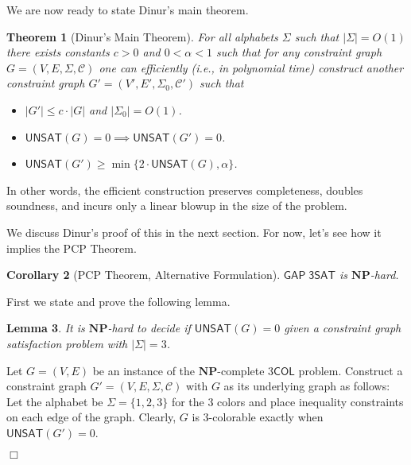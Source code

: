 \documentclass{article}
\newtheorem{theorem}{Theorem}
\newtheorem{example}[theorem]{Example}
\newtheorem{lemma}[theorem]{Lemma}
\newtheorem{corollary}[theorem]{Corollary}
\newenvironment{proof}{\noindent{\bf Proof:} \hspace*{1mm}}{
	\hspace*{\fill} $\Box$ }
\newcommand{\class}[1]{\mathbf{#1}}
\newcommand{\NP}{\class{NP}}
\newcommand{\COL}{\mathsf{COL}}
\newcommand{\UNSAT}{\mathsf{UNSAT}}
\newcommand{\GAPSAT}{\mathsf{GAP\;3SAT}}
\begin{document}

We are now ready to state Dinur's main theorem.

\begin{theorem}[Dinur's Main Theorem]\label{dinursthm}
For all alphabets $\Sigma$ such that $|\Sigma| = O(1)$ there exists constants $c > 0$ and
$0 < \alpha < 1$ such that for any constraint graph $G = (V, E, \Sigma, \mathcal{C})$
one can efficiently (i.e., in polynomial time) construct another constraint graph
$G' = (V', E', \Sigma_0, \mathcal{C}')$ such that
\begin{itemize}[leftmargin=10em]
\item[\textbf{(Linear blowup)}] $|G'| \le c \cdot |G|$ and $|\Sigma_0| = O(1)$.
\item[\textbf{(Completeness)}] $\UNSAT(G)=0 \implies \UNSAT(G')=0$.
\item[\textbf{(Soundness)}] $\UNSAT(G')\ge \min\{2\cdot\UNSAT(G), \alpha\}$.
\end{itemize}
\end{theorem}
In other words, the efficient construction preserves completeness, doubles
soundness, and incurs only a linear blowup in the size of the problem.

We discuss Dinur's proof of this in the next section.
For now, let's see how it implies the PCP Theorem.

\begin{corollary}[PCP Theorem, Alternative Formulation]\label{corollary}
$\GAPSAT$ is $\NP$-hard.
\end{corollary}

First we state and prove the following lemma.

\begin{lemma}\label{csg-hard} It is $\NP$-hard to decide if $\UNSAT(G)=0$ given
a constraint graph satisfaction problem with $|\Sigma| = 3$.
\end{lemma}

\begin{proof}%
Let $G = (V,E)$ be an instance of the $\NP$-complete $3\COL$ problem.
Construct a constraint graph $G'=(V, E, \Sigma, \mathcal{C})$ with
$G$ as its underlying graph as follows:
Let the alphabet be $\Sigma = \{1, 2, 3\}$ for the 3 colors and place
inequality constraints on each edge of the graph.
Clearly, $G$ is 3-colorable exactly when $\UNSAT(G')=0$.
\end{proof}\\
\end{document}
